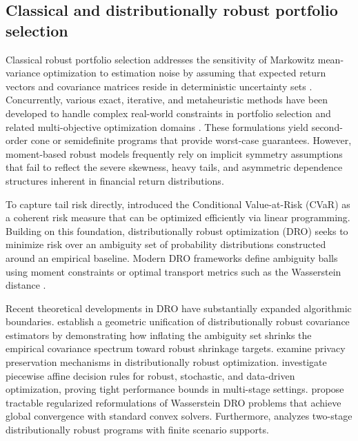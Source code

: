 \documentclass[11pt, a4paper]{article}
\begin{document}
\subsection{Classical and distributionally robust portfolio selection}
Classical robust portfolio selection addresses the sensitivity of Markowitz mean-variance optimization to estimation noise by assuming that expected return vectors and covariance matrices reside in deterministic uncertainty sets \citep{goldfarb2003robust, fabozzi2007robust}. Concurrently, various exact, iterative, and metaheuristic methods have been developed to handle complex real-world constraints in portfolio selection and related multi-objective optimization domains \citep{bezoui2019iterative, regaigui2025memetic, bezoui2024hybrid}. These formulations yield second-order cone or semidefinite programs that provide worst-case guarantees. However, moment-based robust models frequently rely on implicit symmetry assumptions that fail to reflect the severe skewness, heavy tails, and asymmetric dependence structures inherent in financial return distributions.

To capture tail risk directly, \citet{rockafellar2000optimization, rockafellar2002conditional} introduced the Conditional Value-at-Risk (CVaR) as a coherent risk measure that can be optimized efficiently via linear programming. Building on this foundation, distributionally robust optimization (DRO) seeks to minimize risk over an ambiguity set of probability distributions constructed around an empirical baseline. Modern DRO frameworks define ambiguity balls using moment constraints \citep{delage2010distributionally} or optimal transport metrics such as the Wasserstein distance \citep{esfahani2018data}.

Recent theoretical developments in DRO have substantially expanded algorithmic boundaries. \citet{yue2026geometric} establish a geometric unification of distributionally robust covariance estimators by demonstrating how inflating the ambiguity set shrinks the empirical covariance spectrum toward robust shrinkage targets. \citet{selvi2025differential} examine privacy preservation mechanisms in distributionally robust optimization. \citet{thoma2026piecewise} investigate piecewise affine decision rules for robust, stochastic, and data-driven optimization, proving tight performance bounds in multi-stage settings. \citet{chu2026wasserstein} propose tractable regularized reformulations of Wasserstein DRO problems that achieve global convergence with standard convex solvers. Furthermore, \citet{agra2025two} analyzes two-stage distributionally robust programs with finite scenario supports.
\end{document}
